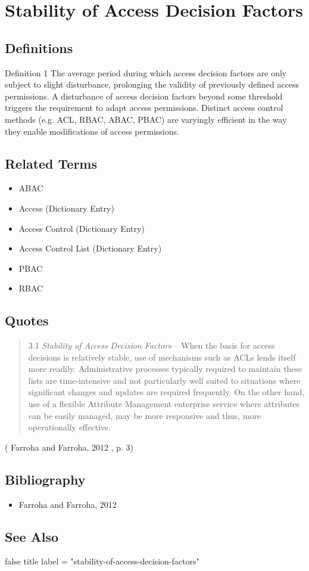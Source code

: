 \section*{Stability of Access Decision Factors }\subsection*{Definitions } \begin{DIC_Def}{Definition 1 }{}The average period during which access decision factors are only subject to slight disturbance, prolonging the validity of previously defined access permissions. A disturbance of access decision factors beyond some threshold triggers the requirement to adapt access permissions. Distinct access control methods (e.g. ACL, RBAC, ABAC, PBAC) are varyingly efficient in the way they enable modifications of access permissions. \end{DIC_Def}\subsection*{Related Terms }\begin{itemize} \item   ABAC \item   Access (Dictionary Entry) \item   Access Control (Dictionary Entry) \item   Access Control List (Dictionary Entry) \item   PBAC \item   RBAC \end{itemize} \subsection*{Quotes }\begin{quote} 3.1 \emph{Stability of Access Decision Factors} -- When the basis for access decisions is relatively stable, use of mechanisms such as ACLs lends itself more readily. Administrative processes typically required to maintain these lists are time-intensive and not particularly well suited to situations where significant changes and updates are required frequently. On the other hand, use of a flexible Attribute Management enterprise service where attributes can be easily managed, may be more responsive and thus, more operationally effective. \end{quote}  ( Farroha and Farroha, 2012 , p. 3) \subsection*{Bibliography }\begin{itemize} \item   Farroha and Farroha, 2012 \end{itemize} \subsection*{See Also }false title label = "stability-of-access-decision-factors" 